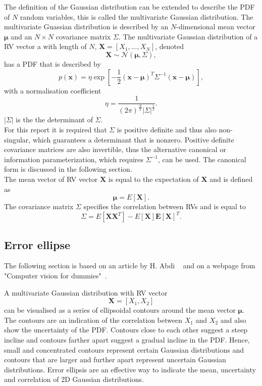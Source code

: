 \documentclass[12pt,oneside,openany,a4paper, %
afrikaans,english,
]{memoir}
\numberwithin{equation}{chapter}
\begin{document}
The definition of the Gaussian distribution can be extended to describe the PDF of $N$ random variables, this is called the multivariate Gaussian distribution. The multivariate Guassian distribution is described by an $N$-dimensional mean vector $\bm{\mu}$ and an $N\times N$ covariance matrix $\Sigma$. The multivariate Gaussian distribution of a RV vector a with length of $N$, $\bm{X} = [X_1,...,X_N]$, denoted
\begin{equation}
\bm{X} \sim \mathcal{N}(\bm{\mu},\Sigma),
\end{equation}
has a PDF that is described by
\begin{equation}\label{eq:3}
p(\bm{x})  = \eta\exp\left[-\frac{1}{2}(\bm{x}-\bm{\mu})^T\Sigma^{-1}(\bm{x}-\bm{\mu})\right],
\end{equation}
with a normalisation coefficient
\begin{equation}\label{eq:4}
\eta = \frac{1}{(2\pi)^{\frac{N}{2}}|\Sigma|^{\frac{1}{2}}}.
\end{equation}
$|\Sigma|$ is the the determinant of $\Sigma$.\\
For this report it is required that $\Sigma$ is positive definite and thus also non-singular, which guarantees a determinant that is nonzero. Positive definite covariance matrices are also invertible, thus the alternative canonical or information parameterization, which requires $\Sigma^{-1}$, can be used. The canonical form is discussed in the following section.\\
The mean vector of RV vector $\bm{X}$ is equal to the expectation of $\bm{X}$ and is defined as
\begin{equation}
\bm{\mu} = E[\bm{X}].
\end{equation}
The covariance matrix $\Sigma$ specifies the correlation between RVs and is equal to
\begin{equation}
\Sigma = E[\bm{XX}^T] - E[\bm{X}]\bm{E}[\bm{X}]^T.
\end{equation}
\subsection{Error ellipse}The following section is based on an article by H. Abdi ~\cite{abdi} and on a webpage from "Computer vision for dummies"~\cite{draw_ellipse}.\par
A multivariate Gaussian distribution with RV vector
\begin{equation}
\bm{X} = [X_1, X_2]
\end{equation}
can be visualised as a series of ellipsoidal contours around the mean vector $\bm{\mu}$. The contours are an indication of the correlation between $X_1$ and $X_2$ and also show the uncertainty of the PDF. Contours close to each other suggest a steep incline and contours farther apart suggest a gradual incline in the PDF. Hence, small and concentrated contours represent certain Gaussian distributions and contours that are larger and further apart represent uncertain Gaussian distributions. Error ellipsis are an effective way to indicate the mean, uncertainty and correlation of 2D Gaussian distributions.
\end{document}
